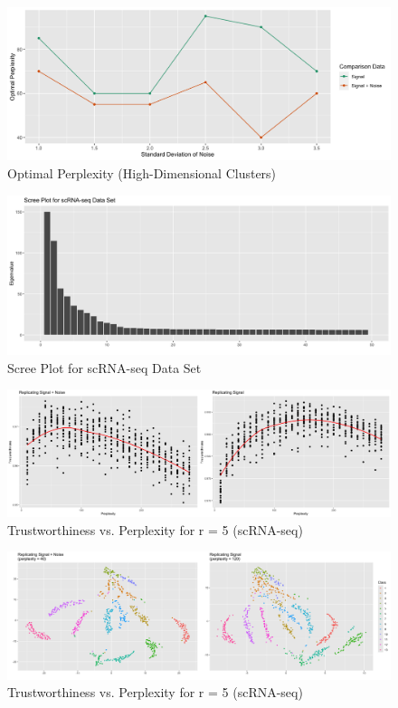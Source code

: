 \documentclass{article}
\begin{document}
\renewcommand{\thefigure}{8}
\begin{figure}[b]
\centering
\includegraphics[scale=0.38]{optimal_perp_high_dim}
\caption{Optimal Perplexity (High-Dimensional Clusters)}
\end{figure}

\renewcommand{\thefigure}{9}
\begin{figure}[t]
\includegraphics[scale=0.3]{scRNA_scree}
\centering
\caption{Scree Plot for scRNA-seq Data Set}
\end{figure}

\renewcommand{\thefigure}{10}
\begin{figure}[b]
\includegraphics[scale=0.22]{trust_plot_scRNA}
\centering
\caption{Trustworthiness vs. Perplexity for r = 5 (scRNA-seq)}
\end{figure}

\renewcommand{\thefigure}{11}
\begin{figure}[t]
\includegraphics[scale=0.11]{best_rep_scRNA}
\centering
\caption{Trustworthiness vs. Perplexity for r = 5 (scRNA-seq)}
\end{figure}
\end{document}
